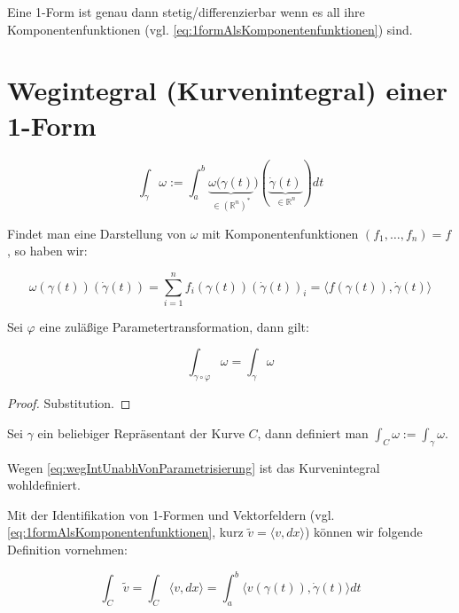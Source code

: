 \begin{definition}
	Eine 1-Form ist genau dann stetig/differenzierbar wenn es all ihre Komponentenfunktionen (vgl. \eqref{eq:1formAlsKomponentenfunktionen}) sind.
\end{definition}




\section{Wegintegral (Kurvenintegral) einer 1-Form}
\begin{definition}
	$$\int_\gamma \omega := \int_a^b \underbrace{\omega(\gamma(t)}_{\in (\mathbb R^n)^*})(\underbrace{\dot\gamma(t)}_{\in \mathbb R^n})dt$$
\end{definition}

\begin{remark}
	Findet man eine Darstellung von $\omega$ mit Komponentenfunktionen $(f_1,\dots,f_n)=f$, so haben wir:
	
	$$\omega(\gamma(t))(\dot\gamma(t)) = \sum_{i=1}^n f_i(\gamma(t))(\dot\gamma(t))_i = \langle f(\gamma(t)), \dot\gamma(t)\rangle$$
\end{remark}

\begin{lemma}
	Sei $\varphi$ eine zul\"a\ss ige Parametertransformation, dann gilt:
	
	\begin{equation}\label{eq:wegIntUnabhVonParametrisierung}
		\int_{\gamma\circ\varphi} \omega = \int_\gamma \omega
	\end{equation}
\end{lemma}

\begin{proof}
	Substitution.
\end{proof}

\begin{definition}[Kurvenintegral]
	Sei $\gamma$ ein beliebiger Repr\"asentant der Kurve $C$, dann definiert man $\int_C \omega := \int_\gamma \omega$.
\end{definition}
\begin{remark}
	Wegen \eqref{eq:wegIntUnabhVonParametrisierung} ist das Kurvenintegral wohldefiniert.
\end{remark}

\begin{remark}
	Mit der Identifikation von 1-Formen und Vektorfeldern (vgl. \eqref{eq:1formAlsKomponentenfunktionen}, kurz $\tilde v = \langle v, dx\rangle$) k\"onnen wir folgende Definition vornehmen:
\end{remark}
\begin{definition}
	$$\int_C \tilde v = \int_C \langle v,dx \rangle = \int_a^b \langle v(\gamma(t)), \dot\gamma(t)\rangle dt$$
\end{definition}




